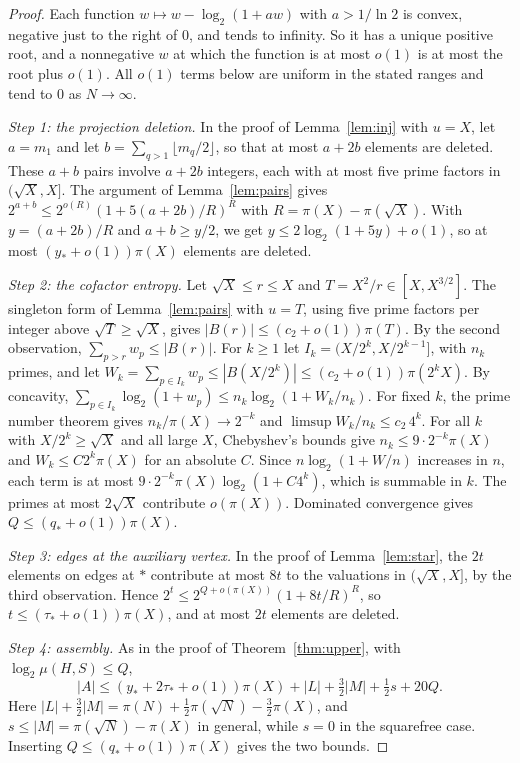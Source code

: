 \documentclass[11pt]{article}
\numberwithin{equation}{section}
\theoremstyle{remark}
\begin{document}
\begin{proof}
Each function $w\mapsto w-\log_2(1+aw)$ with $a>1/\ln 2$ is convex, negative just to the right of $0$, and tends to infinity. So it has a unique positive root, and a nonnegative $w$ at which the function is at most $o(1)$ is at most the root plus $o(1)$. All $o(1)$ terms below are uniform in the stated ranges and tend to $0$ as $N\to\infty$.

\emph{Step 1: the projection deletion.} In the proof of Lemma~\ref{lem:inj} with $u=X$, let $a=m_1$ and let $b=\sum_{q>1}\lfloor m_q/2\rfloor$, so that at most $a+2b$ elements are deleted. These $a+b$ pairs involve $a+2b$ integers, each with at most five prime factors in $(\sqrt X,X]$. The argument of Lemma~\ref{lem:pairs} gives $2^{a+b}\le2^{o(R)}(1+5(a+2b)/R)^R$ with $R=\pi(X)-\pi(\sqrt X)$. With $y=(a+2b)/R$ and $a+b\ge y/2$, we get $y\le2\log_2(1+5y)+o(1)$, so at most $(y_*+o(1))\pi(X)$ elements are deleted.

\emph{Step 2: the cofactor entropy.} Let $\sqrt X\le r\le X$ and $T=X^2/r\in[X,X^{3/2}]$. The singleton form of Lemma~\ref{lem:pairs} with $u=T$, using five prime factors per integer above $\sqrt T\ge\sqrt X$, gives $|B(r)|\le(c_2+o(1))\pi(T)$. By the second observation, $\sum_{p>r}w_p\le|B(r)|$. For $k\ge1$ let $I_k=(X/2^k,X/2^{k-1}]$, with $n_k$ primes, and let $W_k=\sum_{p\in I_k}w_p\le|B(X/2^k)|\le(c_2+o(1))\pi(2^kX)$. By concavity, $\sum_{p\in I_k}\log_2(1+w_p)\le n_k\log_2(1+W_k/n_k)$. For fixed $k$, the prime number theorem gives $n_k/\pi(X)\to2^{-k}$ and $\limsup W_k/n_k\le c_2\,4^k$. For all $k$ with $X/2^k\ge\sqrt X$ and all large $X$, Chebyshev's bounds give $n_k\le 9\cdot2^{-k}\pi(X)$ and $W_k\le C2^k\pi(X)$ for an absolute $C$. Since $n\log_2(1+W/n)$ increases in $n$, each term is at most $9\cdot2^{-k}\pi(X)\log_2(1+C4^k)$, which is summable in $k$. The primes at most $2\sqrt X$ contribute $o(\pi(X))$. Dominated convergence gives $Q\le(q_*+o(1))\pi(X)$.

\emph{Step 3: edges at the auxiliary vertex.} In the proof of Lemma~\ref{lem:star}, the $2t$ elements on edges at $*$ contribute at most $8t$ to the valuations in $(\sqrt X,X]$, by the third observation. Hence $2^t\le2^{Q+o(\pi(X))}(1+8t/R)^R$, so $t\le(\tau_*+o(1))\pi(X)$, and at most $2t$ elements are deleted.

\emph{Step 4: assembly.} As in the proof of Theorem~\ref{thm:upper}, with $\log_2\mu(H,S)\le Q$,
\[
|A|\le(y_*+2\tau_*+o(1))\pi(X)+|L|+\tfrac32|M|+\tfrac12s+20Q.
\]
Here $|L|+\frac32|M|=\pi(N)+\frac12\pi(\sqrt N)-\frac32\pi(X)$, and $s\le|M|=\pi(\sqrt N)-\pi(X)$ in general, while $s=0$ in the squarefree case. Inserting $Q\le(q_*+o(1))\pi(X)$ gives the two bounds.
\end{proof}
\end{document}
